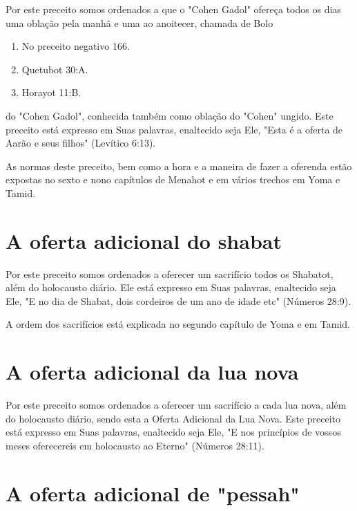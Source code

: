 \begin{itemize}
\begin{enumrate}
\begin{itemize}
\begin{itemize}
Por este preceito somos ordenados a que o "Cohen Gadol" ofereça todos os
dias uma oblação pela manhã e uma ao anoitecer, chamada de Bolo


\begin{enumerate}
\def\labelenumi{\arabic{enumi}.}
\setcounter{enumi}{63}
\item
 
 No preceito negativo 166.
 
\item
 
 Quetubot 30:A.
 
\item
 
 Horayot 11:B.
 
\end{enumerate}




do "Cohen Gadol", conhecida também como oblação do "Cohen" ungido. Este
preceito está expresso em Suas palavras, enaltecido seja Ele, "Esta é a
oferta de Aarão e seus filhos" (Levítico 6:13).

As normas deste preceito, bem como a hora e a maneira de fazer a
oferenda estão expostas no sexto e nono capítulos de Menahot e em vários
tre­chos em Yoma e Tamid.

\section{A oferta adicional do shabat}

Por este preceito somos ordenados a oferecer um sacrifício todos os
Shabatot, além do holocausto diário. Ele está expresso em Suas palavras,
enal­tecido seja Ele, "E no dia de Shabat, dois cordeiros de um ano de
idade etc" (Números 28:9).

A ordem dos sacrifícios está explicada no segundo capítulo de Yo­ma e em
Tamid.

\section{A oferta adicional da lua nova}

Por este preceito somos ordenados a oferecer um sacrifício a cada lua
nova, além do holocausto diário, sendo esta a Oferta Adicional da Lua
No­va. Este preceito está expresso em Suas palavras, enaltecido seja
Ele, "E nos princípios de vossos meses oferecereis em holocausto ao
Eterno" (Números 28:11).


\section{A oferta adicional de "pessah"}



\end{itemize}
\end{itemize}
\end{enumrate}
\end{itemize}
